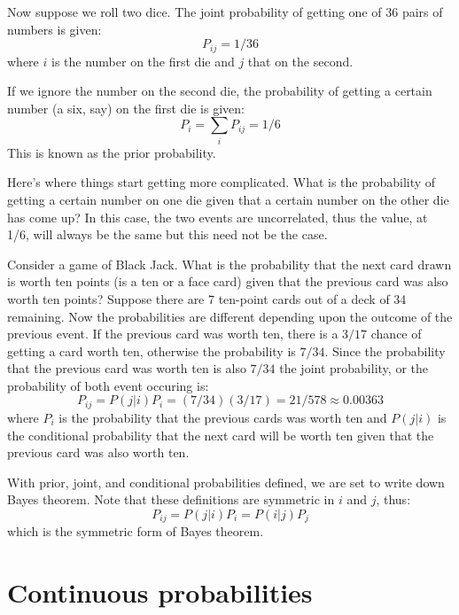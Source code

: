 \documentclass{article}
\begin{document}
Now suppose we roll two dice. 
The joint probability of getting one of 36 pairs of numbers is given:
\begin{equation}
	P_{ij} = 1/36
\end{equation}
where $i$ is the number on the first die and $j$ that on the second.

If we ignore the number on the second die, the probability of getting a
certain number (a six, say) on the first die is given:
\begin{equation}
	P_i = \sum_i P_{ij} = 1/6
	\label{prior_prob}
\end{equation}
This is known as the prior probability.

Here's where things start getting more complicated.
What is the probability of getting a certain number on one die given that
 a certain number on the other die has come up?
In this case, the two events are uncorrelated, thus the value, at 1/6, will
always be the same but this need not be the case.

Consider a game of Black Jack.
What is the probability that the next card drawn is worth ten points (is a ten
or a face card) given that the previous card was also worth ten points?
Suppose there are 7 ten-point cards out of a deck of 34 remaining.
Now the probabilities are different depending upon the outcome of the previous
event.
If the previous card was worth ten, there is a $3/17$ chance of getting a card
worth ten, otherwise the probability is $7/34$.
Since the probability that the previous card was worth ten is also $7/34$
the joint probability, or the probability of both event occuring is:
\begin{equation}
	P_{ij} = P(j | i) P_i = (7/34)(3/17) = 21/578 \approx 0.00363
	\label{joint_prob}
\end{equation}
where $P_i$ is the probability that the previous cards was worth ten and
$P(j|i)$ is the conditional probability that the next card will be worth ten
given that the previous card was also worth ten.

With prior, joint, and conditional probabilities defined, we are set to write
down Bayes theorem.
Note that these definitions are symmetric in $i$ and $j$, thus:
\begin{equation}
	P_{ij} = P(j|i) P_i = P(i|j) P_j
	\label{Bayes_thm}
\end{equation}
which is the symmetric form of Bayes theorem.

\section{Continuous probabilities}
\end{document}
